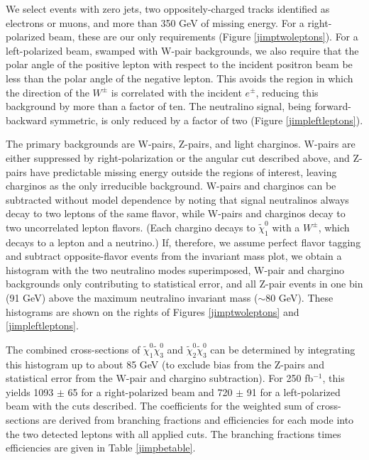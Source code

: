 \documentclass[12pt]{article}
\begin{document}
We select events with zero jets, two oppositely-charged tracks
identified as electrons or muons, and more than 350 GeV of missing
energy.  For a right-polarized beam, these are our only requirements
(Figure \ref{jimptwoleptons}).  For a left-polarized beam, swamped with
W-pair backgrounds, we also require that the polar angle of the
positive lepton with respect to the incident positron beam be less
than the polar angle of the negative lepton.  This avoids the region
in which the direction of the $W^\pm$ is correlated with the incident
$e^\pm$, reducing this background by more than a factor of ten.  The
neutralino signal, being forward-backward symmetric, is only reduced
by a factor of two (Figure \ref{jimpleftleptons}).

The primary backgrounds are W-pairs, Z-pairs, and light charginos.
W-pairs are either suppressed by right-polarization or the angular cut
described above, and Z-pairs have predictable missing energy outside
the regions of interest, leaving charginos as the only irreducible
background.  W-pairs and charginos can be subtracted without model
dependence by noting that signal neutralinos always decay to two
leptons of the same flavor, while W-pairs and charginos decay to two
uncorrelated lepton flavors.  (Each chargino decays to
$\tilde{\chi}^0_1$ with a $W^\pm$, which decays to a lepton and a
neutrino.)  If, therefore, we assume perfect flavor tagging and
subtract opposite-flavor events from the invariant mass plot, we
obtain a histogram with the two neutralino modes superimposed, W-pair
and chargino backgrounds only contributing to statistical error, and
all Z-pair events in one bin (91 GeV) above the maximum neutralino
invariant mass ($\sim$80 GeV).  These histograms are shown on the
rights of Figures \ref{jimptwoleptons} and \ref{jimpleftleptons}.

The combined cross-sections of $\tilde{\chi}^0_1\tilde{\chi}^0_3$ and
$\tilde{\chi}^0_2\tilde{\chi}^0_3$ can be determined by integrating
this histogram up to about 85 GeV (to exclude bias from the Z-pairs
and statistical error from the W-pair and chargino subtraction).  For
250 fb$^{-1}$, this yields 1093 $\pm$ 65 for a right-polarized beam
and 720 $\pm$ 91 for a left-polarized beam with the cuts described.
The coefficients for the weighted sum of cross-sections are derived
from branching fractions and efficiencies for each mode into the two
detected leptons with all applied cuts.  The branching fractions times
efficiencies are given in Table
\ref{jimpbetable}.
\end{document}
